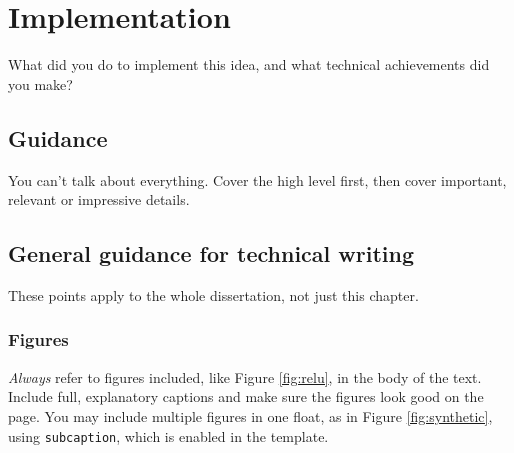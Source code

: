 \documentclass{l4proj}
\begin{document}


\chapter{Implementation}
What did you do to implement this idea, and what technical achievements did you make?
\section{Guidance}
You can't talk about everything. Cover the high level first, then cover important, relevant or impressive details.

\section{General guidance for technical writing}

These points apply to the whole dissertation, not just this chapter.

\subsection{Figures}
\emph{Always} refer to figures included, like Figure \ref{fig:relu}, in the body of the text. Include full, explanatory captions and make sure the figures look good on the page.
You may include multiple figures in one float, as in Figure \ref{fig:synthetic}, using \texttt{subcaption}, which is enabled in the template.
\end{document}
